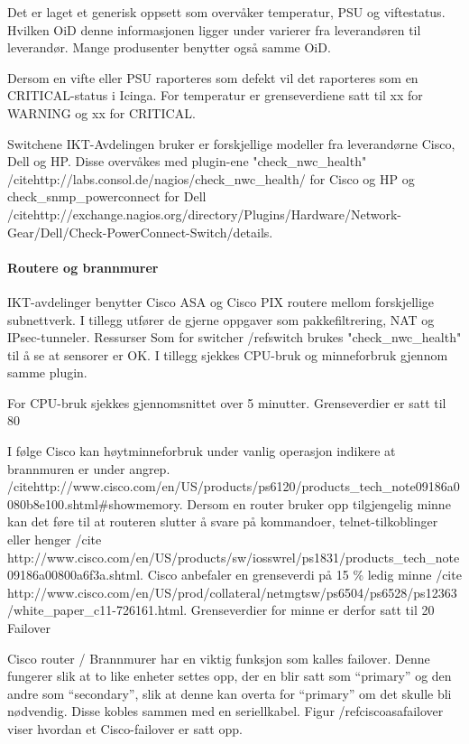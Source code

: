Det er laget et generisk oppsett som overvåker temperatur, PSU og viftestatus. Hvilken OiD denne informasjonen ligger under varierer fra leverandøren til leverandør. Mange produsenter benytter også samme OiD. 

Dersom en vifte eller PSU raporteres som defekt vil det raporteres som en CRITICAL-status i Icinga. For temperatur er grenseverdiene satt til xx for WARNING og xx for CRITICAL.

Switchene IKT-Avdelingen bruker er forskjellige modeller fra leverandørne Cisco, Dell og HP. Disse overvåkes med plugin-ene "check\_nwc\_health" /cite{http://labs.consol.de/nagios/check\_nwc\_health/} for Cisco og HP og check\_snmp\_powerconnect for Dell /cite{http://exchange.nagios.org/directory/Plugins/Hardware/Network-Gear/Dell/Check-PowerConnect-Switch/details}.

\paragraph{Routere og brannmurer}
IKT-avdelinger benytter Cisco ASA og Cisco PIX routere mellom forskjellige subnettverk. I tillegg utfører de gjerne oppgaver som pakkefiltrering, NAT og IPsec-tunneler.
Ressurser
Som for switcher /ref{switch} brukes "check\_nwc\_health" til å se at sensorer er OK. I tillegg
sjekkes CPU-bruk og minneforbruk gjennom samme plugin. 

For CPU-bruk sjekkes gjennomsnittet over 5 minutter. Grenseverdier er satt til 80 %

I følge Cisco kan høytminneforbruk under vanlig operasjon indikere at brannmuren er under angrep. /cite{http://www.cisco.com/en/US/products/ps6120/products\_tech\_note09186a0080b8e100.shtml#showmemory}. Dersom en router bruker opp tilgjengelig minne kan det føre til at routeren slutter å svare på kommandoer, telnet-tilkoblinger eller henger /cite http://www.cisco.com/en/US/products/sw/iosswrel/ps1831/products\_tech\_note09186a00800a6f3a.shtml. Cisco anbefaler en grenseverdi på 15 \% ledig minne /cite {http://www.cisco.com/en/US/prod/collateral/netmgtsw/ps6504/ps6528/ps12363/white\_paper\_c11-726161.html}. Grenseverdier for minne er derfor satt til 20 %
Failover

Cisco router / Brannmurer har en viktig funksjon som kalles failover. Denne fungerer slik at to like enheter settes opp, der en blir satt som “primary” og den andre som “secondary”, slik at denne kan overta for “primary” om det skulle bli nødvendig. Disse kobles sammen med en seriellkabel. Figur /ref{ciscoasafailover} viser hvordan et Cisco-failover er satt opp. 

